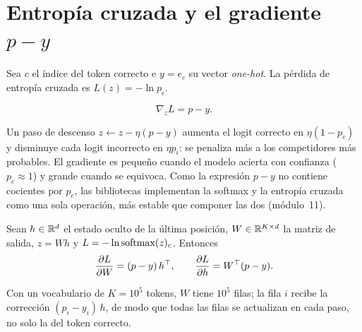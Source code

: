 \section{Entropía cruzada y el gradiente \texorpdfstring{$p-y$}{p − y}}

Sea $c$ el índice del token correcto e $y=e_c$ su vector \emph{one-hot}. La pérdida de entropía cruzada es $L(z)=-\ln p_c$.

\begin{teorema}\label{teo:p-y}
\[
\nabla_z L=p-y.
\]
\end{teorema}

\addtocounter{definicion}{1}%

\begin{observacion}[Interpretación]
Un paso de descenso $z\leftarrow z-\eta(p-y)$ aumenta el logit correcto en $\eta(1-p_c)$ y disminuye cada logit incorrecto en $\eta p_i$: se penaliza más a los competidores más probables. El gradiente es pequeño cuando el modelo acierta con confianza ($p_c\approx 1$) y grande cuando se equivoca. Como la expresión $p-y$ no contiene cocientes por $p_c$, las bibliotecas implementan la softmax y la entropía cruzada como una sola operación, más estable que componer las dos (módulo~11).
\end{observacion}

\begin{corolario}\label{cor:salida}
Sean $h\in\mathbb{R}^{d}$ el estado oculto de la última posición, $W\in\mathbb{R}^{K\times d}$ la matriz de salida, $z=Wh$ y $L=-\ln\operatorname{softmax}(z)_c$. Entonces
\[
\frac{\partial L}{\partial W}=(p-y)\,h^{\top},\qquad\frac{\partial L}{\partial h}=W^{\top}(p-y).
\]
\end{corolario}

Con un vocabulario de $K=10^{5}$ tokens, $W$ tiene $10^{5}$ filas; la fila $i$ recibe la corrección $(p_i-y_i)\,h$, de modo que todas las filas se actualizan en cada paso, no solo la del token correcto.

